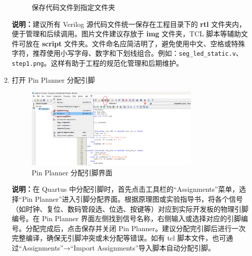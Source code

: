 \documentclass[UTF8]{article}
\theoremstyle{MyLineTheoremStyle} %
\theoremstyle{MyBlockTheoremStyle} %
\theoremstyle{MySubsubsectionStyle} %
\begin{document}
\begin{enumerate}
\begin{figure}[H]
        \caption{保存代码文件到指定文件夹}
        \label{fig:step5}
    \end{figure}
    \textbf{说明：}建议所有 Verilog 源代码文件统一保存在工程目录下的 \textbf{rtl} 文件夹内，便于管理和后续调用。图片文件建议存放于 \textbf{img} 文件夹，TCL 脚本等辅助文件可放在 \textbf{script} 文件夹。文件命名应简洁明了，避免使用中文、空格或特殊字符，推荐使用小写字母、数字和下划线组合。例如：\texttt{seg\_led\_static.v}、\texttt{step1.png}。这样有助于工程的规范化管理和后期维护。

\cleardoublepage

    \item 打开 Pin Planner 分配引脚
    \begin{figure}[H]
        \centering
        \includegraphics[width=0.8\textwidth]{step6.png}
        \caption{Pin Planner 分配引脚界面}
        \label{fig:step6}
    \end{figure}
    \textbf{说明：}在 Quartus 中分配引脚时，首先点击工具栏的“Assignments”菜单，选择“Pin Planner”进入引脚分配界面。根据原理图或实验指导书，将各个信号（如时钟、复位、数码管段选、位选、按键等）对应到实际开发板的物理引脚编号。在 Pin Planner 界面左侧找到信号名称，右侧输入或选择对应的引脚编号。分配完成后，点击保存并关闭 Pin Planner。建议分配完引脚后进行一次完整编译，确保无引脚冲突或未分配等错误。如有 tcl 脚本文件，也可通过“Assignments”→“Import Assignments”导入脚本自动分配引脚。
\cleardoublepage


\end{enumerate}
\end{document}
